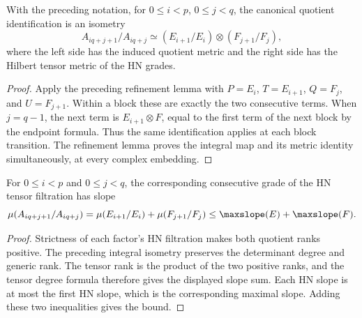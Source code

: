 \begin{lemma}
\label{lem:hn-tensor-grades}
\leanok
With the preceding notation, for $0\leq i<p$, $0\leq j<q$, the
canonical quotient identification is an isometry
\[
 A_{iq+j+1}/A_{iq+j}\simeq
 (E_{i+1}/E_i)\otimes(F_{j+1}/F_j),
\]
where the left side has the induced quotient metric and the right
side has the Hilbert tensor metric of the HN grades.
\end{lemma}
\begin{proof}
Apply the preceding refinement lemma with $P=E_i$, $T=E_{i+1}$,
$Q=F_j$, and $U=F_{j+1}$. Within a block these are exactly the two
consecutive terms. When $j=q-1$, the next term is
$E_{i+1}\otimes F$, equal to the first term of the next block by the
endpoint formula. Thus the same identification applies at each block
transition. The refinement lemma proves the integral map and its metric
identity simultaneously, at every complex embedding.
\end{proof}

\begin{lemma}
\label{lem:hn-tensor-grade-slopes}
\leanok
For $0\leq i<p$ and $0\leq j<q$, the corresponding consecutive grade
of the HN tensor filtration has slope
\[
 \mu(A_{iq+j+1}/A_{iq+j})
 =\mu(E_{i+1}/E_i)+\mu(F_{j+1}/F_j)
 \leq\maxslope(E)+\maxslope(F).
\]
\end{lemma}
\begin{proof}
Strictness of each factor's HN filtration makes both quotient ranks
positive. The preceding integral isometry preserves the determinant
degree and generic rank. The tensor rank is the product of the two
positive ranks, and the tensor degree formula therefore gives the
displayed slope sum. Each HN slope is at most the first HN slope,
which is the corresponding maximal slope. Adding these two
inequalities gives the bound.
\end{proof}

